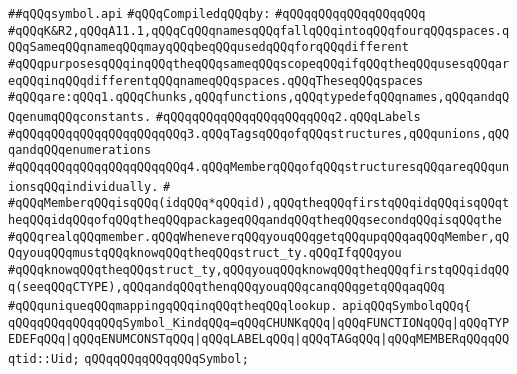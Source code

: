 \label{src/lib/c-kit/src/ast/symbol.api}
\verb|##qQQqsymbol.api|\newline
\newline
\verb|#qQQqCompiledqQQqby:|\newline
\verb|#qQQqqQQqqQQqqQQqqQQq|\newline
\newline
\verb|#qQQqK&R2,qQQqA11.1,qQQqCqQQqnamesqQQqfallqQQqintoqQQqfourqQQqspaces.qQQqSameqQQqnameqQQqmayqQQqbeqQQqusedqQQqforqQQqdifferent|\newline
\verb|#qQQqpurposesqQQqinqQQqtheqQQqsameqQQqscopeqQQqifqQQqtheqQQqusesqQQqareqQQqinqQQqdifferentqQQqnameqQQqspaces.qQQqTheseqQQqspaces|\newline
\verb|#qQQqare:qQQq1.qQQqChunks,qQQqfunctions,qQQqtypedefqQQqnames,qQQqandqQQqenumqQQqconstants.|\newline
\verb|#qQQqqQQqqQQqqQQqqQQqqQQq2.qQQqLabels|\newline
\verb|#qQQqqQQqqQQqqQQqqQQqqQQq3.qQQqTagsqQQqofqQQqstructures,qQQqunions,qQQqandqQQqenumerations|\newline
\verb|#qQQqqQQqqQQqqQQqqQQqqQQq4.qQQqMemberqQQqofqQQqstructuresqQQqareqQQqunionsqQQqindividually.|\newline
\verb|#|\newline
\verb|#qQQqMemberqQQqisqQQq(idqQQq*qQQqid),qQQqtheqQQqfirstqQQqidqQQqisqQQqtheqQQqidqQQqofqQQqtheqQQqpackageqQQqandqQQqtheqQQqsecondqQQqisqQQqthe|\newline
\verb|#qQQqrealqQQqmember.qQQqWheneverqQQqyouqQQqgetqQQqupqQQqaqQQqMember,qQQqyouqQQqmustqQQqknowqQQqtheqQQqstruct_ty.qQQqIfqQQqyou|\newline
\verb|#qQQqknowqQQqtheqQQqstruct_ty,qQQqyouqQQqknowqQQqtheqQQqfirstqQQqidqQQq(seeqQQqCTYPE),qQQqandqQQqthenqQQqyouqQQqcanqQQqgetqQQqaqQQq|\newline
\verb|#qQQquniqueqQQqmappingqQQqinqQQqtheqQQqlookup.|\newline
\newline
\newline
\newline
\verb|apiqQQqSymbolqQQq{|\newline
\newline
\verb|qQQqqQQqqQQqqQQqSymbol_KindqQQq=qQQqCHUNKqQQq|\verb#|qQQqFUNCTIONqQQq|qQQqTYPEDEFqQQq|qQQqENUMCONSTqQQq|qQQqLABELqQQq|qQQqTAGqQQq|qQQqMEMBERqQQqqQQqtid::Uid;#\newline
\newline
\verb|qQQqqQQqqQQqqQQqSymbol;|\newline
